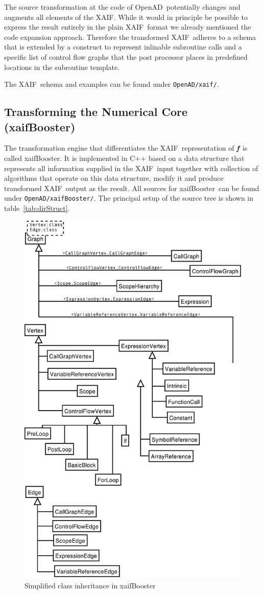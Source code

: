 \documentclass{book}
\newcommand{\OpenAD}{OpenAD}
\newcommand{\xaif}{XAIF}
\newcommand{\xaifBooster}{xaifBooster}
\newcommand{\bmf}{\mbox{\bf\em f}}
\newcommand{\reftab}[1]{{table~\ref{#1}}}
\begin{document}
The source transformation at the code of \OpenAD\ potentially changes and augments 
all elements of the \xaif. While it would in principle be possible  
to express the result entirely in the plain \xaif\ format we already mentioned the 
code expansion approach. Therefore the transformed \xaif\ adheres to a schema 
that is extended by a construct to represent inlinable subroutine calls and 
a specific list of control flow graphs that the post processor places in predefined 
locations in the subroutine template.    

The \xaif\ schema and examples can be found under \lstinline{OpenAD/xaif/}.

\subsection{Transforming the Numerical Core (\xaifBooster)} \label{sec:xaifBooster}
The transformation engine that differentiates the \xaif\ representation of 
$\bmf$ is called \xaifBooster. It is implemented in C++ based on a 
data structure that represents all information supplied in the \xaif\ input 
together with collection of algorithms that operate on this data structure, modify 
it and produce transformed \xaif\ output as the result. All sources for \xaifBooster\ can be found under \lstinline{OpenAD/xaifBooster/}. The principal setup of the source tree is shown in \reftab{tab:dirStruct}.
\begin{figure}
  \centering \includegraphics[width=.45\textwidth]{irInh}
  \caption{Simplified class inheritance in \xaifBooster} \label{fig:iri}
\end{figure}
\end{document}
